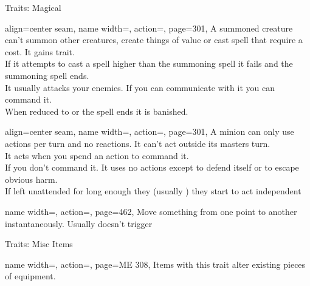 \begin{PageFront}
\begin{Tables}{\frontTableHeight}
\begin{Table}{Traits: Magical}
\begin{entry}{}{%
                align=center seam,
                name width=\conditionLength,%
                action=\Summoned,
                page=301,
            }
                A summoned creature can't summon other creatures, create things of value or cast spell that require a
                cost. It gains \Minion trait.\\
                If it attempts to cast a spell higher than the summoning spell it fails and the summoning spell ends. \\
                It usually attacks your enemies. If you can communicate with it you can command it.\hfill {}\\
                When reduced to  \HPs or the spell ends it is banished. \hfill{} \hfill {}
            \end{entry}
            \begin{entry}{}{%
                align=center seam,
                name width=\conditionLength,%
                action=\Minion,
                page=301,
            }
                A minion can only use  actions per turn and no reactions. It can't act outside its
                masters turn.\\
                It acts when you spend an action to command it. 
                \\If you don't command it. It uses no actions except to defend itself or to escape obvious harm.\\
                If left unattended for long enough they {(usually )} they start to act independent
            \end{entry}
            \begin{entry}{}{%
                name width=\conditionLength,%
                action=\Teleportation,
                page=462,
            }
                Move something from one point to another instantaneously. Usually doesn't trigger 
            \end{entry}
        \end{Table}\TableSpace
        \begin{Table}{Traits: Misc Items}
            \begin{entry}{}{%
                name width=\conditionLength,%
                action=\Adjustment,
                page=ME 308,
            }
                Items with this trait alter existing pieces of equipment. \hfill {}
\end{entry}
\end{Table}
\end{Tables}
\end{PageFront}
